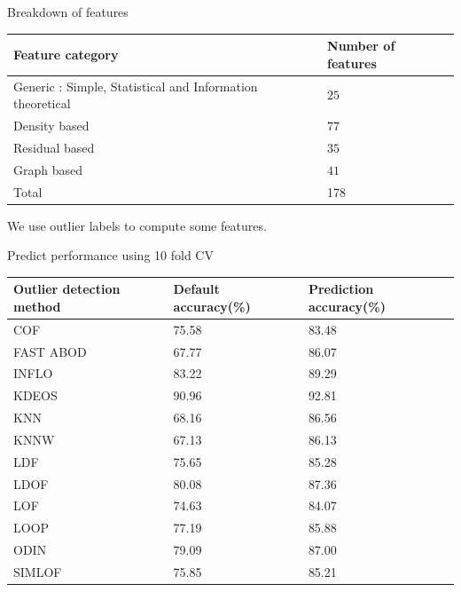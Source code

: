 \documentclass{beamer}
\begin{document}
\begin{darkframes}
\begin{frame}{Breakdown of features}
\begin{table}[!t]
	\footnotesize
	\begin{tabular}{p{3.5cm}p{3cm}}
		\toprule
		Feature category       & Number of features \\
		\midrule
		 Generic : Simple, Statistical and Information theoretical & $25$               \\ %
		Density based          & $77$               \\
		Residual based         & $35$               \\
		Graph based            & $41$               \\
		\midrule
		Total                  & 178                   \\
		\bottomrule
	\end{tabular}
	\label{tab:featureCount}
\end{table}
 We use outlier labels to compute some features.
 \end{frame}	
 	
\begin{frame}{Predict performance using 10 fold CV}
    \begin{table}[!t]
	\centering
	\footnotesize
	\begin{tabular}{p{3.5cm}p{3cm}p{3cm}}
		\toprule
		Outlier detection method & Default accuracy(\%)  & Prediction accuracy(\%)       \\
		\midrule
		COF                      & 75.58      & 83.48                   \\
		FAST ABOD                & 67.77      & 86.07                    \\
		INFLO                    & 83.22      & 89.29                    \\
		KDEOS                    & 90.96      & 92.81                    \\
		KNN                      & 68.16      & 86.56                    \\
		KNNW                     & 67.13      & 86.13                     \\
		LDF                      & 75.65      & 85.28                    \\
		LDOF                     & 80.08      & 87.36                   \\
		LOF                      & 74.63      & 84.07                    \\
		LOOP                     & 77.19      & 85.88                     \\
		ODIN                     & 79.09      & 87.00                    \\
		SIMLOF                   & 75.85      & 85.21                    \\
		\bottomrule
	\end{tabular}
	\label{table:predOutPerf}
\end{table}
\end{frame}


\end{darkframes}
\end{document}
